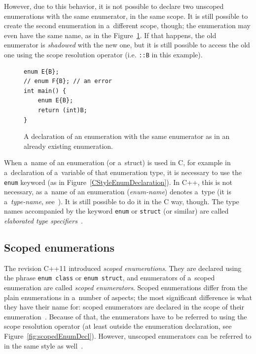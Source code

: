 \documentclass[nolot,nolof,nocover,printed]{fithesis3}
\newcommand{\stdN}[2]{\cite[#2]{#1}\xspace}
\begin{document}
However, due to this behavior, it is not possible to declare two unscoped enumerations with the same enumerator, in the same scope. It is still possible to create the second enumeration in a~different scope, though; the enumeration may even have the same name, as in the Figure~\ref{fig:collidingEnumerators}. If that happens, the old enumerator is \textit{shadowed} with the new one, but it is still possible to access the old one using the scope resolution operator (i.e. \lstinline|::B| in this example).
\begin{figure}
\begin{lstlisting}
enum E{B};
// enum F{B}; // an error
int main() { 
    enum E{B};
    return (int)B;
}  
\end{lstlisting}
\caption{A declaration of an enumeration with the same enumerator as in an already existing enumeration.}
\label{fig:collidingEnumerators}
\end{figure}


When a~name of an enumeration (or a~struct) is used in C, for example in a~declaration of a~variable of that enumeration type, it is necessary to use the \lstinline|enum| keyword (as in Figure~\ref{CStyleEnumDeclaration}). In C++, this is not necessary, as a~name of an enumeration (\textit{enum-name}) denotes a~type (it is a~\textit{type-name}, see~\stdN{n4296}{Annex A.1}). It is still possible to do it in the C way, though. The type names accompanied by the keyword \lstinline|enum| or \lstinline|struct| (or similar) are called \textit{elaborated type specifiers}~\stdN{n4296}{\S 3.4.4}.

\subsection{Scoped enumerations}

The revision C++11 introduced \textit{scoped enumerations}. They are declared using the phrase \lstinline|enum class| or \lstinline|enum struct|, and enumerators of a~scoped enumeration are called \textit{scoped enumerators}. Scoped enumerations differ from the plain enumerations in a~number of aspects; the most significant difference is what they have their name for: scoped enumerators are declared in the scope of their enumeration~\stdN{n4296}{\S 7.2/11}. Because of that, the enumerators have to be referred to using the scope resolution operator (at least outside the enumeration declaration, see Figure~\ref{fig:scopedEnumDecl}). However, unscoped enumerators can be referred to in the same style as well~\stdN{n4296}{\S 5.1.1/11}.
\end{document}
